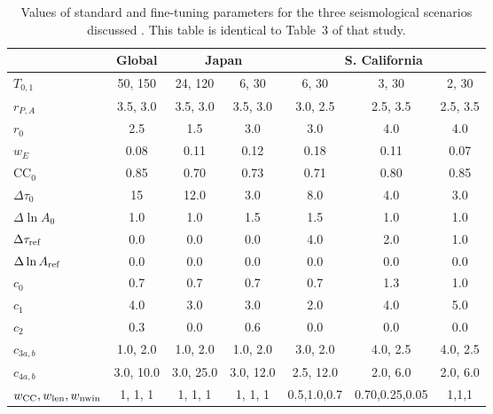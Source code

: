 \begin{table}
\begin{center}
\begin{tabular}{lcccccc}
\hline
			& Global	& \multicolumn{2}{c}{Japan}	& \multicolumn{3}{c}{S. California} \\
\hline
$T_{0,1}$		& 50, 150	& 24, 120 	& 6, 30		& 6, 30		& 3, 30		& 2, 30		\\
$r_{P,A}$		& 3.5, 3.0	& 3.5, 3.0	& 3.5, 3.0	& 3.0, 2.5	& 2.5, 3.5	& 2.5, 3.5	\\
$r_0$			& 2.5		& 1.5		& 3.0		& 3.0		& 4.0		& 4.0		\\
$w_E$			& 0.08		& 0.11		& 0.12		& 0.18		& 0.11		& 0.07		\\
$\mathrm{CC}_0$		& 0.85		& 0.70		& 0.73		& 0.71		& 0.80		& 0.85		\\
$\Delta\tau_0$		& 15		& 12.0		& 3.0		& 8.0		& 4.0		& 3.0		\\
$\Delta\ln{A}_0$	& 1.0 		& 1.0		& 1.5		& 1.5		& 1.0		& 1.0		\\ 
$\Delta\tau_{\rm ref}$	& 0.0		& 0.0		& 0.0		& 4.0		& 2.0 		& 1.0		\\
$\Delta\ln{A}_{\rm ref}$& 0.0		& 0.0		& 0.0		& 0.0		& 0.0		& 0.0		\\
\hline
$c_0$			& 0.7		& 0.7		& 0.7		& 0.7		& 1.3		& 1.0		\\
$c_1$			& 4.0		& 3.0		& 3.0		& 2.0		& 4.0		& 5.0		\\
$c_2$			& 0.3		& 0.0		& 0.6		& 0.0		& 0.0		& 0.0		\\
$c_{3a,b}$		& 1.0, 2.0	& 1.0, 2.0	& 1.0, 2.0	& 3.0, 2.0	& 4.0, 2.5	& 4.0, 2.5	\\
$c_{4a,b}$		& 3.0, 10.0	& 3.0, 25.0	& 3.0, 12.0	& 2.5, 12.0	& 2.0, 6.0	& 2.0, 6.0	\\
$w_{\mathrm{CC}}, w_{\rm len}, w_{\rm nwin}$
			& 1, 1, 1 	& 1, 1, 1	& 1, 1, 1	& 0.5,1.0,0.7	& 0.70,0.25,0.05 & 1,1,1	\\
\hline
\end{tabular}
\caption{\label{tb:example_params}
Values of standard and fine-tuning parameters for the three seismological
scenarios discussed \cite{MaggiEtal2009}.  This table is identical to Table~3 of that study.
} 
\end{center}
\end{table}

